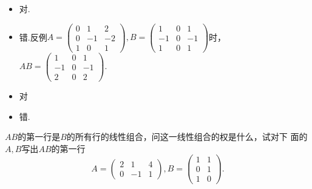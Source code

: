 ﻿\documentclass{book} \usepackage{exsheets} \usepackage{xeCJK}
\begin{document}
\begin{solution}
  \begin{itemize}
  \item 对.
  \item 错.反例$ A=
    \begin{pmatrix}
      0&1&2\\
      0&-1&-2\\
      1&0&1
    \end{pmatrix}, B=
    \begin{pmatrix}
      1&0&1\\
      -1&0&-1\\
      1&0&1
    \end{pmatrix}
    $时，$AB=
    \begin{pmatrix}
      1&0&1\\
      -1&0&-1\\
      2&0&2
    \end{pmatrix}.  $
  \item 对
  \item 错.
  \end{itemize}
\end{solution}
\begin{question}
  $AB$的第一行是$B$的所有行的线性组合，问这一线性组合的权是什么，试对下
  面的$A,B$写出$AB$的第一行
$$
A=
\begin{pmatrix}
  2&1&4\\
  0&-1&1
\end{pmatrix},B=
\begin{pmatrix}
  1&1\\
  0&1\\
  1&0
\end{pmatrix}.
$$
\end{question}
\end{document}
